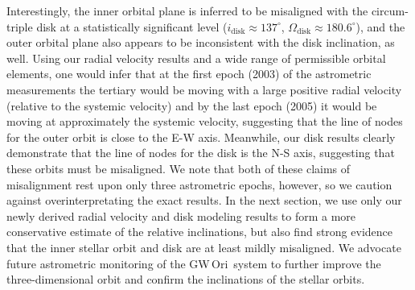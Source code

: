 \documentclass[twocolumn]{aastex61}
\newcommand{\gw}{GW\,Ori}
\begin{document}
Interestingly, the inner orbital plane is inferred to be misaligned with the circum-triple disk at a statistically significant level ($i_\mathrm{disk} \approx 137^\circ$, $\Omega_\mathrm{disk} \approx 180.6^\circ$), and the outer orbital plane also appears to be inconsistent with the disk inclination, as well. Using our radial velocity results and a wide range of permissible orbital elements, one would infer that at the first epoch (2003) of the \citet{berger11} astrometric measurements the tertiary would be moving with a large positive radial velocity (relative to the systemic velocity) and by the last epoch (2005) it would be moving at approximately the systemic velocity, suggesting that the line of nodes for the outer orbit is close to the E-W axis.
Meanwhile, our disk results clearly demonstrate that the line of nodes for the disk is the N-S axis, suggesting that these orbits must be misaligned. We note that both of these claims of misalignment rest upon only three astrometric epochs, however, so we caution against overinterpretating the exact results. In the next section, we use only our newly derived radial velocity and disk modeling results to form a more conservative estimate of the relative inclinations, but also find strong evidence that the inner stellar orbit and disk are at least mildly misaligned. We advocate future astrometric monitoring of the \gw\ system to further improve the three-dimensional orbit and confirm the inclinations of the stellar orbits.
\end{document}
